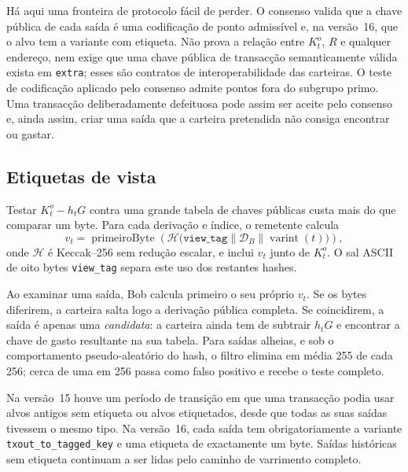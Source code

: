 Há aqui uma fronteira de protocolo fácil de perder. O consenso valida que a
chave pública de cada saída é uma codificação de ponto admissível e, na
versão~16, que o alvo tem a variante com etiqueta. Não prova a relação entre
\(K_t^o\), \(R\) e qualquer endereço, nem exige que uma chave pública de
transacção semanticamente válida exista em \texttt{extra}; esses são
contratos de interoperabilidade das carteiras. O teste de codificação
aplicado pelo consenso admite pontos fora do subgrupo primo.
Uma transacção deliberadamente defeituosa pode assim ser aceite pelo
consenso e, ainda assim, criar uma saída que a carteira pretendida não
consiga encontrar ou gastar.

\subsection*{Etiquetas de vista}

Testar \(K_t^o-h_tG\) contra uma grande tabela de chaves públicas custa mais do
que comparar um byte. Para cada derivação e índice, o remetente calcula
\[
 v_t=\operatorname{primeiroByte}\!\left(
 \mathcal H\bigl(
 \texttt{view\_tag}\mathbin\|\mathcal D_B\mathbin\|
 \operatorname{varint}(t)\bigr)\right),
\]
onde \(\mathcal H\) é Keccak--256 sem redução escalar, e inclui \(v_t\) junto
de \(K_t^o\). O sal ASCII de oito bytes \texttt{view\_tag} separa este uso dos
restantes hashes.


%
Ao examinar uma saída, Bob calcula primeiro o seu próprio \(v_t\). Se os bytes
diferirem, a carteira salta logo a derivação pública completa. Se coincidirem,
a saída é apenas uma \emph{candidata}: a carteira ainda tem de subtrair
\(h_tG\) e encontrar a chave de gasto resultante na sua tabela. Para saídas
alheias, e sob o comportamento pseudo-aleatório do hash, o filtro elimina em
média 255 de cada 256; cerca de uma em 256 passa como falso positivo e recebe
o teste completo.

Na versão~15 houve um período de transição em que uma transacção podia usar
alvos antigos sem etiqueta ou alvos etiquetados, desde que todas as suas
saídas tivessem o mesmo tipo. Na versão~16, cada
saída tem obrigatoriamente a variante \texttt{txout\_to\_tagged\_key} e uma
etiqueta de exactamente um byte. Saídas históricas sem etiqueta continuam a
ser lidas pelo caminho de varrimento completo.


